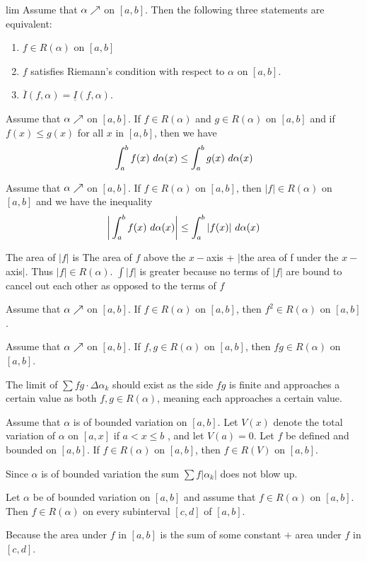 \documentclass[10pt,a4paper]{book}
\begin{document}
\begin{Thm}lim
Assume that $\alpha \nearrow$ on $[a, b]$. Then the following three statements are equivalent: 
\begin{enumerate}
	\item $f \in R(\alpha)$ on $[a,b]$
	\item $f$ satisfies Riemann's condition with respect to $\alpha$ on $[a, b]$.
	\item $\overline{I}(f,\alpha) = \underline{I}(f,\alpha)$.
\end{enumerate}
\end{Thm}

\begin{Thm}
Assume that $\alpha \nearrow$ on $[a, b]$. If $f \in R(\alpha)$ and $g \in R(\alpha)$ on $[a, b]$ and
if $f(x) \leq g(x)$ for all $x$ in $[a, b]$, then we have
$$\int_a^b f(x)\  d \alpha(x) \leq \int_a^b g(x)\  d \alpha(x)$$
\end{Thm}
\begin{Thm}
 Assume that $\alpha \nearrow$ on $[a, b]$. If $f \in R(\alpha)$ on $[a, b]$, then $|f| \in R(\alpha)$ on $[a, b]$ and we have the inequality
 $$\bigg|\int_a^b f(x)\ d \alpha(x)\bigg| \leq \int_a^b |f(x)|\ d \alpha(x)$$
\end{Thm}
\PP The area of $|f|$ is The area of $f$ above the $x-$axis + $|$the area of f under the $x-$axis$|$. Thus $|f| \in R(\alpha)$. $\int |f|$ is greater because no terms of $|f|$ are bound to cancel out each other as opposed to the terms of $f$

\begin{Thm}
 Assume that $\alpha \nearrow$ on $[a, b]$. If $f \in R(\alpha)$ on $[a, b]$, then $f^2 \in R(\alpha)$ on $[a, b]$.
\end{Thm}
\begin{Thm}
 Assume that $\alpha \nearrow$ on $[a, b]$. If $f,g \in R(\alpha)$ on $[a, b]$, then $fg \in R(\alpha)$ on $[a, b]$.
\end{Thm}
\PP The limit of $\sum fg \cdot \Delta \alpha_k$ should exist as the side $fg$ is finite and approaches a certain value as both $f,g \in R(\alpha)$, meaning each approaches a certain value.

\newcommand{\al}{\alpha}
\begin{Thm}
Assume that $\al$ is of bounded variation on $[a, b]$. Let $V(x)$ denote the
total variation of $\al$ on $[a, x]$ if $a < x \leq b$ , and let $V(a) = 0$. Let $f$ be defined and bounded on $[a, b]$. If $f \in R(\al)$ on $[a, b]$, then $f \in R(V)$ on $[a, b]$.
\end{Thm}

\PP Since $\al$ is of bounded variation the sum $\sum f |\al_k|$ does not blow up.
\begin{Thm}
Let $\al$ be of bounded variation on $[a, b]$ and assume that $f \in R(\al)$ on
$[a, b]$. Then $f \in R(\al)$ on every subinterval $[c, d]$ of $[a, b]$.
\end{Thm}
\PP Because the area under $f$ in $[a,b]$ is the sum of some constant $+$ area under $f$ in $[c,d]$.
\end{document}
